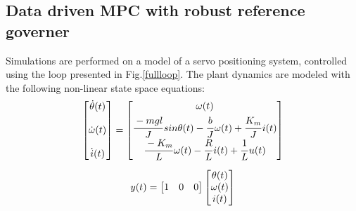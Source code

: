 \documentclass[letterpaper, 10 pt, conference]{ieeeconf}  %
\begin{document}
\begin{enumerate}
	\subsection{Data driven MPC with robust reference governer}
	Simulations are performed on a model of a servo positioning system, controlled using the loop presented in Fig.\ref{fullloop}. The plant dynamics are modeled with the following non-linear state space equations:
	\begin{equation*}
	\begin{matrix}
	\begin{bmatrix}
	\dot{\theta}(t) \vspace{12pt} \\
	\dot{\omega}(t) \vspace{12pt} \\
	\dot{i}(t)
	\end{bmatrix} = 
	\begin{bmatrix}
	\omega(t) \vspace{3pt}\\
	\cfrac{-mgl}{J}\hspace{1pt}sin\theta(t)-\cfrac{b}{J}\hspace{1pt}\omega(t) + \cfrac{K_m}{J}\hspace{1pt}i(t) \\  
	\cfrac{-K_m}{L}\hspace{1pt}\omega(t)-\cfrac{R}{L}\hspace{1pt}i(t) + \cfrac{1}{L}\hspace{1pt}u(t)
	\end{bmatrix} \vspace{10pt}\\
	y(t) = \begin{bmatrix} 1 & 0 & 0 \end{bmatrix} 
	\begin{bmatrix} \theta(t) \\ \omega(t) \\ i(t) \end{bmatrix} 
	\end{matrix}
	\end{equation*}
	

\end{enumerate}
\end{document}
